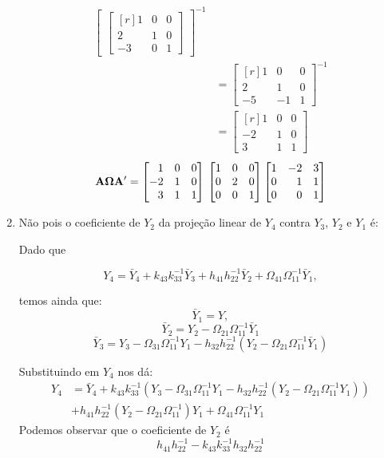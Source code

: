 \begin{enumerate}
\begin{align*}
\begin{bmatrix}
\begin{bmatrix*}[r]
1&0&0\\
2&1&0\\
-3&0&1
\end{bmatrix*}\end{bmatrix}^{-1}\\
&=\begin{bmatrix*}[r]
1&0&0\\
2&1&0\\
-5&-1&1
\end{bmatrix*}^{-1}\\
&=\begin{bmatrix*}[r]
	1&0&0\\
	-2&1&0\\
	3&1&1
\end{bmatrix*}
\end{align*}
$$\mathbf{A}\boldsymbol{\Omega}\mathbf{A}'=\begin{bmatrix*}[r]
1&0&0\\
-2&1&0\\
3&1&1
\end{bmatrix*}\\
\begin{bmatrix*}[r]
1&0&0\\
0&2&0\\
0&0&1
\end{bmatrix*}
\begin{bmatrix*}[r]
1&-2&3\\
0&1&1\\
0&0&1
\end{bmatrix*}$$


	 

	
	\item[\fbox{4.4}]
	
	Não pois o coeficiente de $Y_2$ da projeção linear de $Y_4$ contra $Y_3$, $Y_2$ e $Y_1$ é:
	
	Dado que
	
	$$Y_4=\bar{Y}_4+k_{43}k_{33}^{-1}\bar{Y}_3+h_{41}h_{22}^{-1}\bar{Y}_2+\Omega_{41}\Omega_{11}^{-1}\bar{Y}_1,$$
	
	temos ainda que:
	  $$\bar{Y}_1=Y,$$
	 $$\bar{Y}_2=Y_2-\Omega_{21}\Omega_{11}^{-1}\bar{Y}_1$$
	 $$\bar{Y}_3=Y_3-\Omega_{31}\Omega_{11}^{-1}Y_1-h_{32}h_{22}^{-1}(Y_2-\Omega_{21}\Omega_{11}^{-1}\bar{Y}_1)$$
	 
	 Substituindo em $Y_4$ nos dá:
	 	\begin{align*}
	 	Y_4&=\bar{Y}_4+k_{43}k_{33}^{-1}(Y_3-\Omega_{31}\Omega_{11}^{-1}Y_1-h_{32}h_{22}^{-1}(Y_2-\Omega_{21}\Omega_{11}^{-1}{Y}_1))\\
	 	&+h_{41}h_{22}^{-1}(Y_2-\Omega_{21}\Omega_{11}^{-1}){Y}_1+\Omega_{41}\Omega_{11}^{-1}{Y}_1
	 	\end{align*}
	 Podemos observar que o coeficiente de $Y_2$ é 
	 $$h_{41}h_{22}^{-1}-k_{43}k_{33}^{-1}h_{32}h_{22}^{-1}$$
	 

\end{enumerate}
